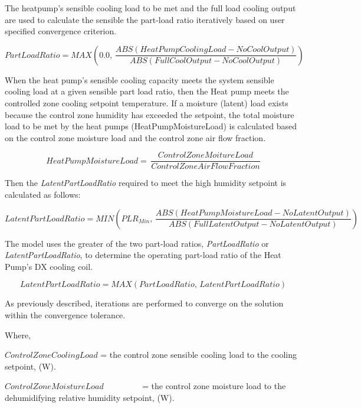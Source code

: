 The heatpump's sensible cooling load to be met and the full load cooling output are used to calculate the sensible the part-load ratio iteratively based on user specified convergence criterion.

\begin{equation}
PartLoadRatio = MAX\left( {0.0,\,\frac{{ABS\left( {HeatPumpCoolingLoad - NoCoolOutput} \right)}}{{ABS\left( {FullCoolOutput - NoCoolOutput} \right)}}} \right)
\end{equation}

When the heat pump's sensible cooling capacity meets the system sensible cooling load at a given sensible part load ratio, then the Heat pump meets the controlled zone cooling setpoint temperature. If a moisture (latent) load exists because the control zone humidity has exceeded the setpoint, the total moisture load to be met by the heat pumps (HeatPumpMoistureLoad) is calculated based on the control zone moisture load and the control zone air flow fraction.

\begin{equation}
HeatPumpMoistureLoad = \,\frac{{ControlZoneMoitureLoad}}{{ControlZoneAirFlowFraction}}
\end{equation}

Then the \emph{LatentPartLoadRatio} required to meet the high humidity setpoint is calculated as follows:

\begin{equation}
LatentPartLoadRatio = MIN\left( {PL{R_{Min}},\,\frac{{ABS\left( {HeatPumpMoistureLoad - NoLatentOutput} \right)}}{{ABS\left( {FullLatentOutput - NoLatentOutput} \right)}}} \right)
\end{equation}

The model uses the greater of the two part-load ratios, \emph{PartLoadRatio} or \emph{LatentPartLoadRatio}, to determine the operating part-load ratio of the Heat Pump's DX cooling coil.

\begin{equation}
LatentPartLoadRatio = MAX\left( {PartLoadRatio,\,LatentPartLoadRatio} \right)
\end{equation}

As previously described, iterations are performed to converge on the solution within the convergence tolerance.

Where,

\(ControlZoneCoolingLoad\) = the control zone sensible cooling load to the cooling setpoint, (W).

\(ControlZoneMoistureLoad\) ~~~~~~~~ = the control zone moisture load to the dehumidifying relative humidity setpoint, (W).

